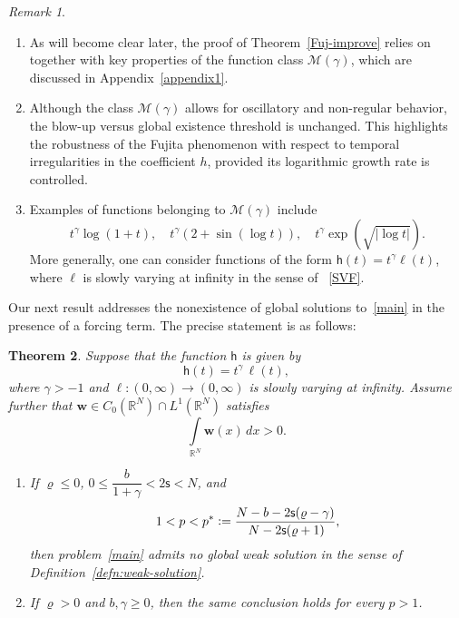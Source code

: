 \documentclass[12pt,reqno]{amsart}
\theoremstyle{plain}
\newtheorem{thm}{Theorem}[section]
\theoremstyle{definition}
\theoremstyle{remark}
\newtheorem{rem}[thm]{Remark}
\numberwithin{equation}{section}
\newcommand{\h}{\mathsf h}
\newcommand{\ts}{\mathsf{s}}
\begin{document}
\begin{rem}
    \rm
    ~\begin{enumerate}[label=(\roman*)]
        \item As will become clear later, the proof of Theorem~\ref{Fuj-improve} relies on~\cite[Theorem 6]{Migu-2025} together with key properties of the function class $\mathcal{M}(\gamma)$, which are discussed in Appendix~\ref{appendix1}.

        \item Although the class $\mathcal M(\gamma)$ allows for oscillatory and non-regular behavior,
the blow-up versus global existence threshold is unchanged. This highlights the robustness
of the Fujita phenomenon with respect to temporal irregularities in the coefficient $h$,
provided its logarithmic growth rate is controlled.

        \item Examples of functions belonging to $\mathcal{M}(\gamma)$ include
        $$
        t^\gamma \log(1+t), \quad t^\gamma (2 + \sin(\log t)), \quad t^\gamma \exp\left(\sqrt{|\log t|}\right).
        $$
        More generally, one can consider functions of the form $\h(t) = t^\gamma \ell (t)$, where $\ell $ is slowly varying at infinity in the sense of ~\eqref{SVF}.
    \end{enumerate}
\end{rem}
 Our next result addresses the nonexistence of global solutions to~\eqref{main} in the presence of a forcing term. The precise statement is as follows:
\begin{thm}
\label{Blow-forced}
Suppose that the function $\h$ is given by
\begin{equation}
\label{h-form}
    \h(t) = t^\gamma \, \ell(t),
\end{equation}
where $\gamma > -1$ and $\ell : (0, \infty) \to (0, \infty)$ is slowly varying at infinity.  
Assume further that ${\mathbf w} \in C_0(\mathbb{R}^N) \cap L^1(\mathbb{R}^N)$ satisfies
\begin{equation}
\label{Ass-Forced}
    \int\limits_{\mathbb{R}^N} {\mathbf w}(x)\, dx > 0.
\end{equation}

\begin{enumerate}[label=(\roman*)]
    \item If $\varrho \leq 0$, $0 \leq \dfrac{b}{1+\gamma} < 2\ts < N$, and 
    \begin{equation}
    \label{Fuji-forced}
        1 < p < p^* \vcentcolon  =\frac{N - b - 2\ts(\varrho - \gamma)}{\,N - 2\ts(\varrho+1)},
    \end{equation}
    then problem~\eqref{main} admits no global weak solution in the sense of Definition~\ref{defn:weak-solution}.
    
    \item If $\varrho > 0$ and $b, \gamma \geq 0$, then the same conclusion holds for every $p > 1$.
\end{enumerate}
\end{thm}
\end{document}
